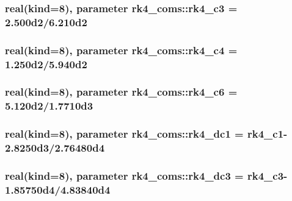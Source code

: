 \subsubsection[{\texorpdfstring{rk4\+\_\+c3}{rk4_c3}}]{\setlength{\rightskip}{0pt plus 5cm}real(kind=8), parameter rk4\+\_\+coms\+::rk4\+\_\+c3 = 2.\+500d2/6.\+210d2}\hypertarget{namespacerk4__coms_a94a604a5d0d271bf875f0fd3338fef3e}{}\label{namespacerk4__coms_a94a604a5d0d271bf875f0fd3338fef3e}
\subsubsection[{\texorpdfstring{rk4\+\_\+c4}{rk4_c4}}]{\setlength{\rightskip}{0pt plus 5cm}real(kind=8), parameter rk4\+\_\+coms\+::rk4\+\_\+c4 = 1.\+250d2/5.\+940d2}\hypertarget{namespacerk4__coms_ae29e60a0912723f4124b219bb67135d8}{}\label{namespacerk4__coms_ae29e60a0912723f4124b219bb67135d8}
\subsubsection[{\texorpdfstring{rk4\+\_\+c6}{rk4_c6}}]{\setlength{\rightskip}{0pt plus 5cm}real(kind=8), parameter rk4\+\_\+coms\+::rk4\+\_\+c6 = 5.\+120d2/1.\+7710d3}\hypertarget{namespacerk4__coms_a50aa680b806d041ad4b2d83b838ce6e4}{}\label{namespacerk4__coms_a50aa680b806d041ad4b2d83b838ce6e4}
\subsubsection[{\texorpdfstring{rk4\+\_\+dc1}{rk4_dc1}}]{\setlength{\rightskip}{0pt plus 5cm}real(kind=8), parameter rk4\+\_\+coms\+::rk4\+\_\+dc1 = {\bf rk4\+\_\+c1}-\/2.\+8250d3/2.\+76480d4}\hypertarget{namespacerk4__coms_a8f2ecc1ddfd20579092c340f3cde39b4}{}\label{namespacerk4__coms_a8f2ecc1ddfd20579092c340f3cde39b4}
\subsubsection[{\texorpdfstring{rk4\+\_\+dc3}{rk4_dc3}}]{\setlength{\rightskip}{0pt plus 5cm}real(kind=8), parameter rk4\+\_\+coms\+::rk4\+\_\+dc3 = {\bf rk4\+\_\+c3}-\/1.\+85750d4/4.\+83840d4}\hypertarget{namespacerk4__coms_ad50fbfa221dd0da30f0c1f4bbc5d4f3e}{}\label{namespacerk4__coms_ad50fbfa221dd0da30f0c1f4bbc5d4f3e}
